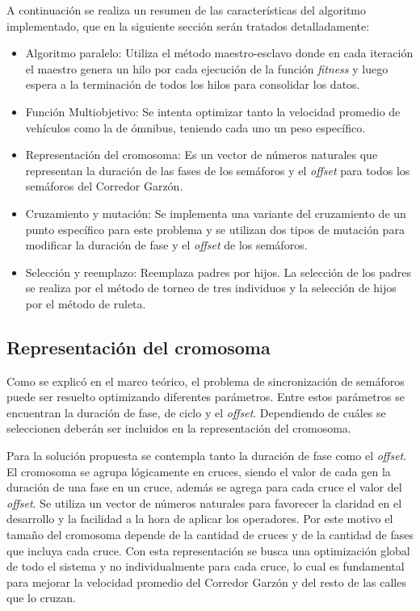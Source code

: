 A continuación se realiza un resumen de las características del algoritmo implementado, que en la siguiente sección serán tratados detalladamente:
\begin{itemize}
	
	\item Algoritmo paralelo: Utiliza el método maestro-esclavo donde en cada iteración el maestro genera un hilo por cada ejecución  de la función \emph{fitness} y luego espera a la terminación de todos los hilos para consolidar los datos. 
	\item Función Multiobjetivo: Se intenta optimizar tanto la velocidad promedio de vehículos como la de ómnibus, teniendo cada uno un peso específico.
	\item Representación del cromosoma: Es un vector de números naturales que representan la duración de las fases de los semáforos y el \emph{offset} para todos los semáforos del Corredor Garzón.
	\item Cruzamiento y mutación: Se implementa una variante del cruzamiento de un punto específico para este problema y se utilizan dos tipos de mutación para modificar la duración de fase y el \emph{offset} de los semáforos.
	\item Selección y reemplazo: Reemplaza padres por hijos. La selección de los padres se realiza por el método de torneo de tres individuos y la selección de hijos por el método de ruleta.
	
\end{itemize}

\subsection{Representación del cromosoma}

Como se explicó en el marco teórico, el problema de sincronización de semáforos puede ser resuelto optimizando diferentes parámetros. Entre estos parámetros se encuentran la duración de fase, de ciclo y el \emph{offset}. Dependiendo de cuáles se seleccionen deberán ser incluidos en la representación del cromosoma.

Para la solución propuesta se contempla tanto la duración de fase como el \emph{offset}. El cromosoma se agrupa lógicamente en cruces, siendo el valor de cada gen la duración de una
fase en un cruce, además se agrega para cada cruce el valor del \emph{offset}. Se utiliza un vector de números naturales para favorecer la claridad en el desarrollo y la facilidad a la hora de aplicar los operadores. Por este motivo el tamaño del cromosoma depende de la cantidad de cruces y de la cantidad de fases que incluya cada cruce. Con esta representación se busca una optimización global de todo el sistema y no individualmente para cada cruce, lo cual es fundamental para mejorar la velocidad promedio del Corredor Garzón y del resto de las calles que lo cruzan.

